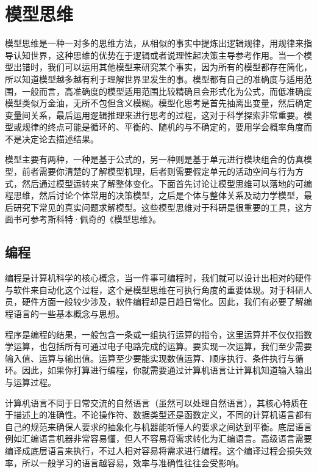 \documentclass[]{tufte-book}
\begin{document}
\hypertarget{ux6a21ux578bux601dux7ef4}{%
\section{模型思维}\label{ux6a21ux578bux601dux7ef4}}

模型思维是一种一对多的思维方法，从相似的事实中提炼出逻辑规律，用规律来指导认知世界，这种思维的优势在于逻辑或者说理性起决策主导参考作用。当一个模型出错时，我们可以运用其他模型来研究某个事实，因为所有的模型都存在简化，所以知道模型越多越有利于理解世界里发生的事。模型都有自己的准确度与适用范围，一般而言，高准确度的模型适用范围比较精确且会形式化为公式，而低准确度模型类似万金油，无所不包但含义模糊。模型化思考是首先抽离出变量，然后确定变量间关系，最后运用逻辑推理来进行思考的过程，这对于科学探索非常重要。模型或规律的终点可能是循环的、平衡的、随机的与不确定的，要用学会概率角度而不是决定论去描述结果。

模型主要有两种，一种是基于公式的，另一种则是基于单元进行模块组合的仿真模型，前者需要你清楚的了解模型机理，后者则需要假定单元的活动空间与行为方式，然后通过模型运转来了解整体变化。下面首先讨论让模型思维可以落地的可编程思维，然后讨论个体常用的决策模型，之后是个体与整体关系及动力学模型，最后研究下常见的真实问题求解模型。这些模型思维对于科研是很重要的工具，这方面书可参考斯科特·佩奇的《模型思维》。

\hypertarget{ux7f16ux7a0b}{%
\subsection{编程}\label{ux7f16ux7a0b}}

编程是计算机科学的核心概念，当一件事可编程时，我们就可以设计出相对的硬件与软件来自动化这个过程，这个是模型思维在可执行角度的重要体现。对于科研人员，硬件方面一般较少涉及，软件编程却是日趋日常化。因此，我们有必要了解编程语言的一些基本概念与思想。

程序是编程的结果，一般包含一条或一组执行运算的指令，这里运算并不仅仅指数学运算，也包括所有可通过电子电路完成的运算。要实现一次运算，我们至少需要输入值、运算与输出值。运算至少要能实现数值运算、顺序执行、条件执行与循环。因此，如果你打算进行编程，你就需要通过计算机语言让计算机知道输入输出与运算过程。

计算机语言不同于日常交流的自然语言（虽然可以处理自然语言），其核心特质在于描述上的准确性。不论操作符、数据类型还是函数定义，不同的计算机语言都有自己的规范来确保人要求的抽象化与机器能听懂人的要求之间达到平衡。底层语言例如汇编语言机器非常容易懂，但人不容易将需求转化为汇编语言。高级语言需要编译成底层语言来执行，不过人相对容易将需求进行编程。这个编译过程会损失效率，所以一般学习的语言越容易，效率与准确性往往会受影响。
\end{document}
